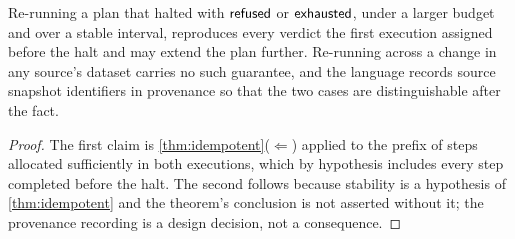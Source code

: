 \begin{corollary}
\label{cor:rerun}
Re-running a plan that halted with $\textsf{refused}$ or $\textsf{exhausted}$, under a larger budget
and over a stable interval, reproduces every verdict the first execution
assigned before the halt and may extend the plan further. Re-running across a
change in any source's dataset carries no such guarantee, and the language
records source snapshot identifiers in provenance so that the two cases are
distinguishable after the fact.
\end{corollary}

\begin{proof}
The first claim is \cref{thm:idempotent}($\Leftarrow$) applied to the prefix of
steps allocated sufficiently in both executions, which by hypothesis includes
every step completed before the halt. The second follows because stability is a
hypothesis of \cref{thm:idempotent} and the theorem's conclusion is not
asserted without it; the provenance recording is a design decision, not a
consequence.
\end{proof}
